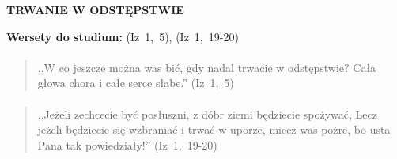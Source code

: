 \documentclass[10pt,a4paper,oneside]{article}
\begin{document}
\centerline{\textbf{\MakeUppercase{Trwanie w odstępstwie}}}
\begin{center}
\textbf{Wersety do studium:} 
\mbox{(Iz 1, 5)}, \mbox{(Iz 1, 19-20)}
\end{center}
\paragraph{}
\begin{quote}
,,W co jeszcze można was bić, gdy nadal trwacie w odstępstwie? Cała głowa chora i całe serce słabe.'' \mbox{(Iz 1, 5)}
\end{quote}
\paragraph{}
\begin{quote}
,,Jeżeli zechcecie być posłuszni, z dóbr ziemi będziecie spożywać, Lecz jeżeli będziecie się wzbraniać i trwać w uporze, miecz was pożre, bo usta Pana tak powiedziały!'' \mbox{(Iz 1, 19-20)}
\end{quote}
\end{document}
